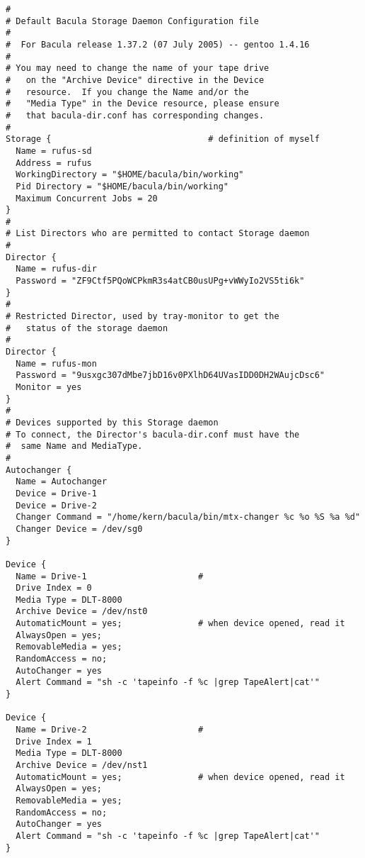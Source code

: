 \footnotesize
\begin{verbatim}
#
# Default Bacula Storage Daemon Configuration file
#
#  For Bacula release 1.37.2 (07 July 2005) -- gentoo 1.4.16
#
# You may need to change the name of your tape drive
#   on the "Archive Device" directive in the Device
#   resource.  If you change the Name and/or the
#   "Media Type" in the Device resource, please ensure
#   that bacula-dir.conf has corresponding changes.
#
Storage {                               # definition of myself
  Name = rufus-sd
  Address = rufus
  WorkingDirectory = "$HOME/bacula/bin/working"
  Pid Directory = "$HOME/bacula/bin/working"
  Maximum Concurrent Jobs = 20
}
#
# List Directors who are permitted to contact Storage daemon
#
Director {
  Name = rufus-dir
  Password = "ZF9Ctf5PQoWCPkmR3s4atCB0usUPg+vWWyIo2VS5ti6k"
}
#
# Restricted Director, used by tray-monitor to get the
#   status of the storage daemon
#
Director {
  Name = rufus-mon
  Password = "9usxgc307dMbe7jbD16v0PXlhD64UVasIDD0DH2WAujcDsc6"
  Monitor = yes
}
#
# Devices supported by this Storage daemon
# To connect, the Director's bacula-dir.conf must have the
#  same Name and MediaType.
#
Autochanger {
  Name = Autochanger
  Device = Drive-1
  Device = Drive-2
  Changer Command = "/home/kern/bacula/bin/mtx-changer %c %o %S %a %d"
  Changer Device = /dev/sg0
}

Device {
  Name = Drive-1                      #
  Drive Index = 0 
  Media Type = DLT-8000
  Archive Device = /dev/nst0
  AutomaticMount = yes;               # when device opened, read it
  AlwaysOpen = yes;
  RemovableMedia = yes;
  RandomAccess = no;
  AutoChanger = yes
  Alert Command = "sh -c 'tapeinfo -f %c |grep TapeAlert|cat'"
}

Device {
  Name = Drive-2                      #
  Drive Index = 1
  Media Type = DLT-8000
  Archive Device = /dev/nst1
  AutomaticMount = yes;               # when device opened, read it
  AlwaysOpen = yes;
  RemovableMedia = yes;
  RandomAccess = no;
  AutoChanger = yes
  Alert Command = "sh -c 'tapeinfo -f %c |grep TapeAlert|cat'"
}


\end{verbatim}
